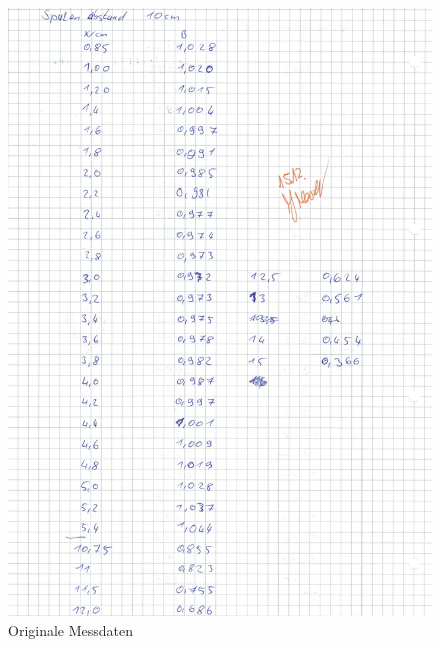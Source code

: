 \begin{figure}[h!]
  \centering
  \includegraphics[width=\textwidth]{OMD6.pdf}
  \caption{Originale Messdaten}
  \label{fig:OMD6}
\end{figure}

